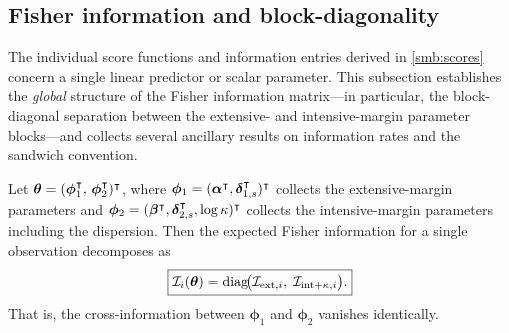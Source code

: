 
\subsection{Fisher information and block-diagonality}\label{smb:fisher-info}

The individual score functions and information entries derived in
\cref{smb:scores} concern a single linear predictor or scalar parameter.
This subsection establishes the \emph{global} structure of the Fisher
information matrix---in particular, the block-diagonal separation between
the extensive- and intensive-margin parameter blocks---and collects
several ancillary results on information rates and the sandwich convention.


\begin{proposition}
\label{smb:prop-block-diag}
  Let\/ $\boldsymbol{\theta} = (\boldsymbol{\phi}_1^\intercal,\, \boldsymbol{\phi}_2^\intercal)^\intercal$, where
  $\boldsymbol{\phi}_1 = (\boldsymbol{\alpha}^\intercal, \boldsymbol{\delta}_{1,s}^\intercal)^\intercal$ collects the
  extensive-margin parameters and
  $\boldsymbol{\phi}_2 = (\boldsymbol{\beta}^\intercal, \boldsymbol{\delta}_{2,s}^\intercal, \log\kappa)^\intercal$ collects the
  intensive-margin parameters including the dispersion.  Then the expected
  Fisher information for a single observation decomposes as
  \begin{equation}\label{smb:eq-block-diag}
    \boxed{%
      \cl{I}_i(\btheta)
      = \diag\!\bigl(\cl{I}_{\textup{ext},i},\;
        \cl{I}_{\textup{int}+\kappa,i}\bigr).
    }
  \end{equation}
  That is, the cross-information between $\boldsymbol{\phi}_1$ and $\boldsymbol{\phi}_2$ vanishes
  identically.
\end{proposition}

